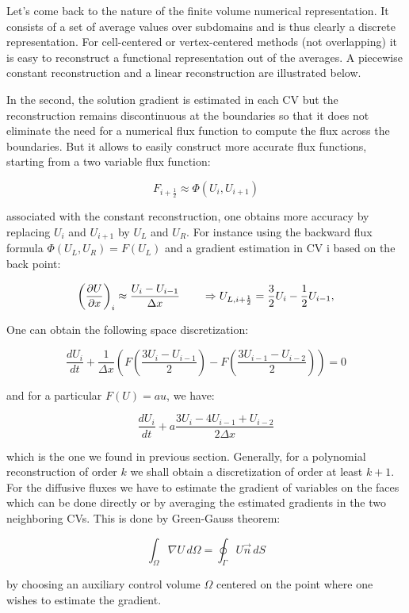 Let's come back to the nature of the finite volume numerical representation. It consists of a set of average values over subdomains and is thus clearly a discrete representation. For cell-centered or vertex-centered methods (not overlapping) it is easy to reconstruct a functional representation out of the averages. A piecewise constant reconstruction and a linear reconstruction are illustrated below. 


In the second, the solution gradient is estimated in each CV but the reconstruction remains discontinuous at the boundaries so that it does not eliminate the need for a numerical flux function to compute the flux across the boundaries. But it allows to easily construct more accurate flux functions, starting from a two variable flux function: 

\begin{equation}
F_{i+\frac{1}{2}} \approx \Phi (U_i , U_{i+1})
\end{equation}

associated with the constant reconstruction, one obtains more accuracy by replacing $U_i$ and $U_{i+1}$ by $U_L$ and $U_R$. For instance using the backward flux formula $\Phi (U_L,U_R) = F(U_L)$ and a gradient estimation in CV i based on the back point:

\begin{equation}
\left(\frac{\partial U}{\partial x} \right)_i \approx \frac{U_i - U_{i-1}}{\Delta x} \qquad \Rightarrow U_{L, i+\frac{1}{2}} = \frac{3}{2} U_i -\frac{1}{2}U_{i-1},
\end{equation}

One can obtain the following space discretization: 

\begin{equation}
\frac{dU_i}{dt} + \frac{1}{\Delta x} \left( F\left(\frac{3U_i - U_{i-1}}{2} \right) - F\left(\frac{3U_{i-1} - U_{i-2}}{2} \right) \right) = 0
\end{equation}

and for a particular $F(U) = au$, we have: 

\begin{equation}
\frac{dU_i}{dt} + a \frac{3U_i - 4U_{i-1}+U_{i-2}}{2\Delta x}
\end{equation}

which is the one we found in previous section. Generally, for a polynomial reconstruction of order $k$ we shall obtain a discretization of order at least $k+1$. For the diffusive fluxes we have to estimate the gradient of variables on the faces which can be done directly or by averaging the estimated gradients in the two neighboring CVs. This is done by Green-Gauss theorem: 

\begin{equation}
\int _\Omega \nabla U \, d\Omega = \oint _\Gamma U\vec{n}\, dS
\end{equation}

by choosing an auxiliary control volume $\Omega$ centered on the point where one wishes to estimate the gradient. 